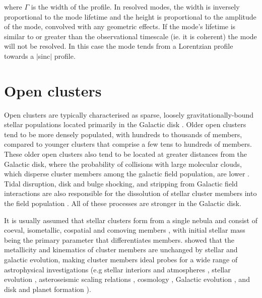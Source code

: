 \noindent where $\Gamma$ is the width of the profile. In resolved modes, the width is inversely proportional to the mode lifetime and the height is proportional to the amplitude of the mode, convolved with any geometric effects. If the mode's lifetime is similar to or greater than the observational timescale (ie. it is coherent) the mode will not be resolved. In this case the mode tends from a Lorentzian profile towards a $|$sinc$|$ profile.


\section{Open clusters}
\label{sect:litrev_ocs}
Open clusters are typically characterised as sparse, loosely gravitationally-bound stellar populations located primarily in the Galactic disk \citep{friel_old_1995, dias_proper_2002, kharchenko_global_2013, cantat-gaudin_clusters_2020}. Older open clusters tend to be more densely populated, with hundreds to thousands of members, compared to younger clusters that comprise a few tens to hundreds of members. These older open clusters also tend to be located at greater distances from the Galactic disk, where the probability of collisions with large molecular clouds, which disperse cluster members among the galactic field population, are lower \cite[][and references therein]{gieles_star_2006}. %
Tidal disruption, disk and bulge shocking, and stripping from Galactic field interactions are also responsible for the dissolution of stellar cluster members into the field population \citep{marchi_search_2006}. All of these processes are stronger in the Galactic disk.%

It is usually assumed that stellar clusters form from a single nebula and consist of coeval, isometallic, cospatial and comoving members \citep{baade_resolution_1944}, with initial stellar mass being the primary parameter that differentiates members. \citet{mould_stellar_1982} showed that the metallicity and kinematics of cluster members are unchanged by stellar and galactic evolution, making cluster members ideal probes for a wide range of astrophysical investigations (e.g stellar interiors and atmospheres \citep{miglio_asteroseismology_2012, corsaro_asteroseismology_2012}, stellar evolution \citep{kalirai_star_2010, jilkova_origin_2012}, asteroseismic scaling relations \citep{stello_amplitudes_2011}, cosmology \citep{krumholz_star_2019}, Galactic evolution \citep{de_grijs_revolution_2010,boesgaard_old_2015}, and disk and planet formation \citep{bonnell_planetary_2001, meibom_same_2013}).

